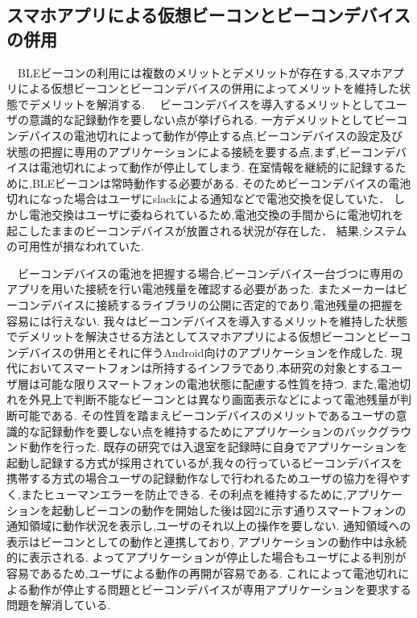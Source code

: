 
\subsection{スマホアプリによる仮想ビーコンとビーコンデバイスの併用}

　BLEビーコンの利用には複数のメリットとデメリットが存在する,スマホアプリによる仮想ビーコンとビーコンデバイスの併用によってメリットを維持した状態でデメリットを解消する.
　ビーコンデバイスを導入するメリットとしてユーザの意識的な記録動作を要しない点が挙げられる.
一方デメリットとしてビーコンデバイスの電池切れによって動作が停止する点,ビーコンデバイスの設定及び状態の把握に専用のアプリケーションによる接続を要する点,まず,ビーコンデバイスは電池切れによって動作が停止してしまう.
在室情報を継続的に記録するために,BLEビーコンは常時動作する必要がある.
そのためビーコンデバイスの電池切れになった場合はユーザにslackによる通知などで電池交換を促していた．
しかし電池交換はユーザに委ねられているため,電池交換の手間からに電池切れを起こしたままのビーコンデバイスが放置される状況が存在した．
結果,システムの可用性が損なわれていた.

　ビーコンデバイスの電池を把握する場合,ビーコンデバイス一台づつに専用のアプリを用いた接続を行い電池残量を確認する必要があった.
またメーカーはビーコンデバイスに接続するライブラリの公開に否定的であり,電池残量の把握を容易には行えない.
我々はビーコンデバイスを導入するメリットを維持した状態でデメリットを解決させる方法としてスマホアプリによる仮想ビーコンとビーコンデバイスの併用とそれに伴うAndroid向けのアプリケーションを作成した.
 現代においてスマートフォンは所持するインフラであり,本研究の対象とするユーザ層は可能な限りスマートフォンの電池状態に配慮する性質を持つ.
また,電池切れを外見上で判断不能なビーコンとは異なり画面表示などによって電池残量が判断可能である.
その性質を踏まえビーコンデバイスのメリットであるユーザの意識的な記録動作を要しない点を維持するためにアプリケーションのバックグラウンド動作を行った.
 既存の研究では入退室を記録時に自身でアプリケーションを起動し記録する方式が採用されているが,我々の行っているビーコンデバイスを携帯する方式の場合ユーザの記録動作なしで行われるためユーザの協力を得やすく,またヒューマンエラーを防止できる.
その利点を維持するために,アプリケーションを起動しビーコンの動作を開始した後は図2に示す通りスマートフォンの通知領域に動作状況を表示し,ユーザのそれ以上の操作を要しない.
通知領域への表示はビーコンとしての動作と連携しており, アプリケーションの動作中は永続的に表示される.
よってアプリケーションが停止した場合もユーザによる判別が容易であるため,ユーザによる動作の再開が容易である.
これによって電池切れによる動作が停止する問題とビーコンデバイスが専用アプリケーションを要求する問題を解消している.


